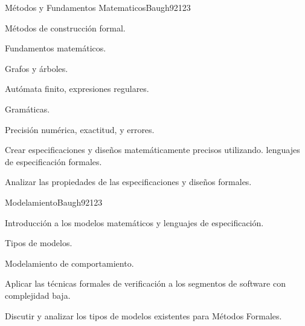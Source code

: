 \begin{syllabus}
\begin{unit}{Métodos y Fundamentos Matematicos}{Baugh92}{12}{3}
\begin{topics}
      \item Métodos de construcción formal.
      \item Fundamentos matemáticos.
      \begin{inparaenum}
         \item Grafos y árboles.
         \item Autómata finito, expresiones regulares.
         \item Gramáticas.
         \item Precisión numérica, exactitud, y errores.
      \end{inparaenum}
   \end{topics}
   \begin{unitgoals}
      \item Crear especificaciones y diseños matemáticamente precisos utilizando. lenguajes de especificación formales.
      \item Analizar las propiedades de las especificaciones y diseños formales.
   \end{unitgoals}
\end{unit}

\begin{unit}{Modelamiento}{Baugh92}{12}{3}
   \begin{topics}
      \item Introducción a los modelos matemáticos y lenguajes de especificación.
      \item Tipos de modelos.
      \item Modelamiento de comportamiento.
   \end{topics}
   \begin{unitgoals}
      \item Aplicar las técnicas formales de verificación a los segmentos de software con complejidad baja.
      \item Discutir y analizar los tipos de modelos existentes para Métodos Formales.
   \end{unitgoals}
\end{unit}


\end{syllabus}
